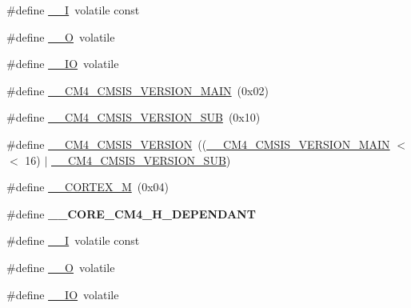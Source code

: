 \begin{DoxyCompactItemize}
\item 
\#define \hyperlink{group___c_m_s_i_s__core__definitions_gaf63697ed9952cc71e1225efe205f6cd3}{\-\_\-\-\_\-\-I}~volatile const
\item 
\#define \hyperlink{group___c_m_s_i_s__core__definitions_ga7e25d9380f9ef903923964322e71f2f6}{\-\_\-\-\_\-\-O}~volatile
\item 
\#define \hyperlink{group___c_m_s_i_s__core__definitions_gaec43007d9998a0a0e01faede4133d6be}{\-\_\-\-\_\-\-I\-O}~volatile
\item 
\#define \hyperlink{group___c_m_s_i_s__core__definitions_ga90ffc8179476f80347379bfe29639edc}{\-\_\-\-\_\-\-C\-M4\-\_\-\-C\-M\-S\-I\-S\-\_\-\-V\-E\-R\-S\-I\-O\-N\-\_\-\-M\-A\-I\-N}~(0x02)
\item 
\#define \hyperlink{group___c_m_s_i_s__core__definitions_gafc7392964da961a44e916fcff7add532}{\-\_\-\-\_\-\-C\-M4\-\_\-\-C\-M\-S\-I\-S\-\_\-\-V\-E\-R\-S\-I\-O\-N\-\_\-\-S\-U\-B}~(0x10)
\item 
\#define \hyperlink{group___c_m_s_i_s__core__definitions_gacb6f5d2c3271c95d0a02fd06723af25d}{\-\_\-\-\_\-\-C\-M4\-\_\-\-C\-M\-S\-I\-S\-\_\-\-V\-E\-R\-S\-I\-O\-N}~((\hyperlink{group___c_m_s_i_s__core__definitions_ga90ffc8179476f80347379bfe29639edc}{\-\_\-\-\_\-\-C\-M4\-\_\-\-C\-M\-S\-I\-S\-\_\-\-V\-E\-R\-S\-I\-O\-N\-\_\-\-M\-A\-I\-N} $<$$<$ 16) $|$ \hyperlink{group___c_m_s_i_s__core__definitions_gafc7392964da961a44e916fcff7add532}{\-\_\-\-\_\-\-C\-M4\-\_\-\-C\-M\-S\-I\-S\-\_\-\-V\-E\-R\-S\-I\-O\-N\-\_\-\-S\-U\-B})
\item 
\#define \hyperlink{group___c_m_s_i_s__core__definitions_ga63ea62503c88acab19fcf3d5743009e3}{\-\_\-\-\_\-\-C\-O\-R\-T\-E\-X\-\_\-\-M}~(0x04)
\item 
\hypertarget{group___c_m_s_i_s__core__definitions_ga65104fb6a96df4ec7f7e72781b561060}{\#define {\bfseries \-\_\-\-\_\-\-C\-O\-R\-E\-\_\-\-C\-M4\-\_\-\-H\-\_\-\-D\-E\-P\-E\-N\-D\-A\-N\-T}}\label{group___c_m_s_i_s__core__definitions_ga65104fb6a96df4ec7f7e72781b561060}

\item 
\#define \hyperlink{group___c_m_s_i_s__core__definitions_gaf63697ed9952cc71e1225efe205f6cd3}{\-\_\-\-\_\-\-I}~volatile const
\item 
\#define \hyperlink{group___c_m_s_i_s__core__definitions_ga7e25d9380f9ef903923964322e71f2f6}{\-\_\-\-\_\-\-O}~volatile
\item 
\#define \hyperlink{group___c_m_s_i_s__core__definitions_gaec43007d9998a0a0e01faede4133d6be}{\-\_\-\-\_\-\-I\-O}~volatile
\end{DoxyCompactItemize}


